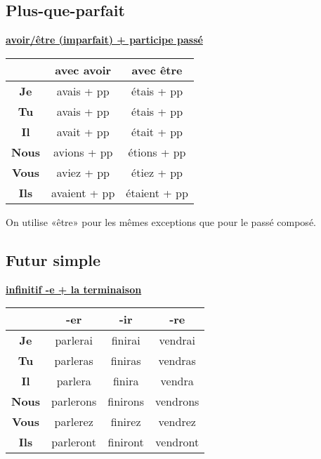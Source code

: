 \documentclass[12pt, a4paper]{article}
\begin{document}
\begin{multicols*}{3}
\subsection{Plus-que-parfait}
\begin{center}
\underline{\textbf{avoir/être (imparfait) + participe passé}}
\begin{tabular}{|c|c|c|}
  \hline
  & \textbf{avec avoir} & \textbf{avec être}\\\hline
  \textbf{Je} & avais + pp & étais + pp \\\hline
  \textbf{Tu} & avais + pp & étais + pp \\\hline
  \textbf{Il} & avait + pp & était + pp \\\hline
  \textbf{Nous} & avions + pp & étions + pp \\\hline
  \textbf{Vous} & aviez + pp & étiez + pp \\\hline
  \textbf{Ils} & avaient + pp & étaient + pp \\\hline
\end{tabular}
\end{center}

On utilise «être» pour les mêmes exceptions que pour le passé composé.
\colbreak

\subsection{Futur simple}
\begin{center}
\underline{\textbf{infinitif -e + la terminaison}}
\begin{tabular}{|c|c|c|c|}
  \hline
  & \textbf{-er} & \textbf{-ir} & \textbf{-re}\\\hline
  \textbf{Je} & parlerai & finirai & vendrai \\\hline
  \textbf{Tu} & parleras & finiras & vendras \\\hline
  \textbf{Il} & parlera & finira & vendra \\\hline
  \textbf{Nous} & parlerons & finirons & vendrons \\\hline
  \textbf{Vous} & parlerez & finirez & vendrez \\\hline
  \textbf{Ils} & parleront & finiront & vendront \\\hline
\end{tabular}
\end{center}


\end{multicols*}
\end{document}
